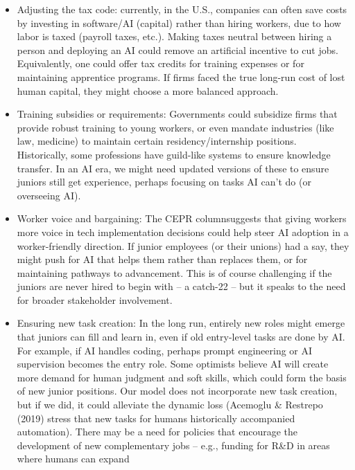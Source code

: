 \documentclass[12pt]{article}
\begin{document}
\begin{itemize}
  \begin{itemize}
  \tightlist
  \item
    Adjusting the {tax code}: currently, in the U.S., companies
    can often save costs by investing in software/AI (capital) rather
    than hiring workers, due to how labor is taxed (payroll taxes,
    etc.). Making taxes neutral between hiring a person and deploying an
    AI could remove an artificial incentive to cut jobs. Equivalently,
    one could offer tax credits for training expenses or for maintaining
    apprentice programs. If firms faced the true long-run cost of lost
    human capital, they might choose a more balanced approach.
  \item
    {Training subsidies or requirements}: Governments could
    subsidize firms that provide robust training to young workers, or
    even mandate industries (like law, medicine) to maintain certain
    residency/internship positions. Historically, some professions have
    {guild-like systems} to ensure knowledge transfer. In an AI
    era, we might need updated versions of these to ensure juniors still
    get experience, perhaps focusing on tasks AI can't do (or overseeing
    AI).
  \item
    {Worker voice and bargaining}: The CEPR columnsuggests that
    giving workers more voice in tech implementation decisions could
    help steer AI adoption in a worker-friendly direction. If junior
    employees (or their unions) had a say, they might push for AI that
    {helps them} rather than replaces them, or for maintaining
    pathways to advancement. This is of course challenging if the
    juniors are never hired to begin with -- a catch-22 -- but it speaks
    to the need for broader stakeholder involvement.
  \item
    {Ensuring new task creation}: In the long run, entirely new
    roles might emerge that juniors can fill and learn in, even if old
    entry-level tasks are done by AI. For example, if AI handles coding,
    perhaps {prompt engineering} or {AI supervision} becomes
    the entry role. Some optimists believe AI will create more demand
    for human judgment and soft skills, which could form the basis of
    new junior positions. Our model does not incorporate new task
    creation, but if we did, it could alleviate the dynamic loss
    (Acemoglu \& Restrepo (2019) stress that new tasks for humans
    historically accompanied automation). There may be a need for
    {policies that encourage the development of new complementary
    jobs} -- e.g., funding for R\&D in areas where humans can expand

\end{itemize}
\end{itemize}
\end{document}
